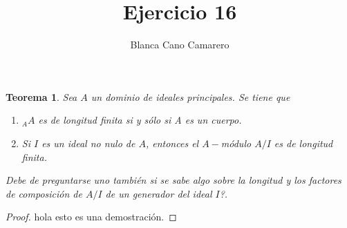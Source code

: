 \documentclass{article}
\title{Ejercicio 16}
\author{Blanca Cano Camarero}
\newtheorem*{teorema*}{Teorema}
\begin{document}
\maketitle

\begin{teorema*}
    Sea $A$ un dominio de ideales principales. 
    Se tiene que
    \begin{enumerate}[i]
        \item ${_A}A$ es de longitud finita si y sólo si A es un cuerpo.
        \item Si $I$ es un ideal no nulo de $A$, entonces el $A-$módulo $A/I$ es de longitud finita. 
    \end{enumerate}
    Debe de preguntarse uno también si se sabe algo sobre la longitud y los factores de composición de $A/I$ de un generador del ideal $I$?.
\end{teorema*}   

\begin{proof}
    hola esto es una demostración.
\end{proof}
\end{document}
